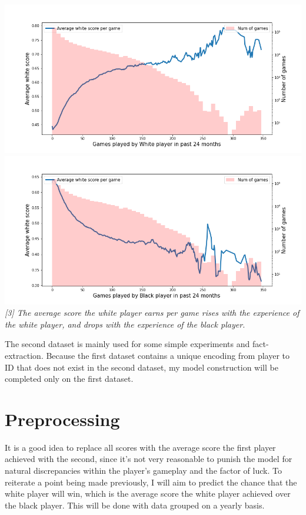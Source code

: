 \documentclass[12pt, letterpaper]{article}
\begin{document}
\begin{multicols}{2}
\begin{center}
\begin{scriptsize}
\includegraphics[width=\linewidth]{../figures/LiChessFigs/white_pre.png}
\includegraphics[width=\linewidth]{../figures/LiChessFigs/black_pre.png}
\textit{[3] The average score the white player earns per game rises with the experience of the white player, and drops with the experience of the black player.
}

\end{scriptsize}
\end{center}
\setlength{\parskip}{0.1cm}

The second dataset is mainly used for some simple experiments and fact-extraction. Because the first dataset contains a unique encoding from player to ID that does not exist in the second dataset, my model construction will be completed only on the first dataset.

\section*{Preprocessing}

It is a good idea to replace all scores with the average score the first player achieved with the second, since it’s not very reasonable to punish the model for natural discrepancies within the player’s gameplay and the factor of luck. To reiterate a point being made previously, I will aim to predict the chance that the white player will win, which is the average score the white player achieved over the black player. This will be done with data grouped on a yearly basis.


\end{multicols}
\end{document}
